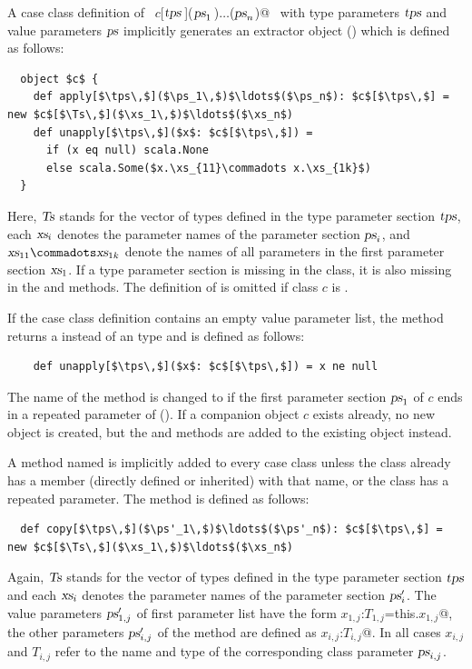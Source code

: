 A case class definition of ~\lstinline@$c$[$\mbox{\sl tps}\,$]($\mbox{\sl ps}_1\,$)$\ldots$($\mbox{\sl ps}_n$)@~ with type
parameters $\mbox{\sl tps}$ and value parameters $\mbox{\sl ps}$ implicitly
generates an extractor object () which is
defined as follows:
\begin{lstlisting}
  object $c$ {
    def apply[$\tps\,$]($\ps_1\,$)$\ldots$($\ps_n$): $c$[$\tps\,$] = new $c$[$\Ts\,$]($\xs_1\,$)$\ldots$($\xs_n$)
    def unapply[$\tps\,$]($x$: $c$[$\tps\,$]) =
      if (x eq null) scala.None
      else scala.Some($x.\xs_{11}\commadots x.\xs_{1k}$)
  }
\end{lstlisting}
Here,
 $\mbox{\sl Ts}$ stands for the vector of types defined in the type
parameter section $\mbox{\sl tps}$,
each $\mbox{\sl xs}_i$ denotes the parameter names of the parameter
section $\mbox{\sl ps}_i$, and
$\xs_{11}\commadots \xs_{1k}$ denote the names of all parameters
in the first parameter section $\mbox{\sl xs}_1$.
If a type parameter section is missing in the
class, it is also missing in the \lstinline@apply@ and
\lstinline@unapply@ methods.
The definition of \lstinline@apply@ is omitted if class $c$ is
\lstinline@abstract@.

If the case class definition contains an empty value parameter list, the
\lstinline@unapply@ method returns a \lstinline@Boolean@ instead of an \lstinline@Option@ type and
is defined as follows:
\begin{lstlisting}
    def unapply[$\tps\,$]($x$: $c$[$\tps\,$]) = x ne null
\end{lstlisting}
The name of the \lstinline@unapply@ method is changed to \lstinline@unapplySeq@ if the first
parameter section $\mbox{\sl ps}_1$ of $c$ ends in a repeated parameter of (). 
If a companion object $c$ exists already, no new object is created,
but the \lstinline@apply@ and \lstinline@unapply@ methods are added to the existing
object instead.

A method named  is implicitly added to every case class unless the
class already has a member (directly defined or inherited) with that name, or the
class has a repeated parameter. The method is defined as follows:
\begin{lstlisting}
  def copy[$\tps\,$]($\ps'_1\,$)$\ldots$($\ps'_n$): $c$[$\tps\,$] = new $c$[$\Ts\,$]($\xs_1\,$)$\ldots$($\xs_n$)
\end{lstlisting}
Again, $\mbox{\sl Ts}$ stands for the vector of types defined in the type parameter section $\mbox{\sl tps}$
and each $\mbox{\sl xs}_i$ denotes the parameter names of the parameter section $\mbox{\sl ps}'_i$. The value
parameters $\mbox{\sl ps}'_{1,j}$ of first parameter list have the form \lstinline@$x_{1,j}$:$T_{1,j}$=this.$x_{1,j}$@,
the other parameters $\mbox{\sl ps}'_{i,j}$ of the  method are defined as \lstinline@$x_{i,j}$:$T_{i,j}$@.
In all cases $x_{i,j}$ and $T_{i,j}$ refer to the name and type of the corresponding class parameter
$\mbox{\sl ps}_{i,j}$.

